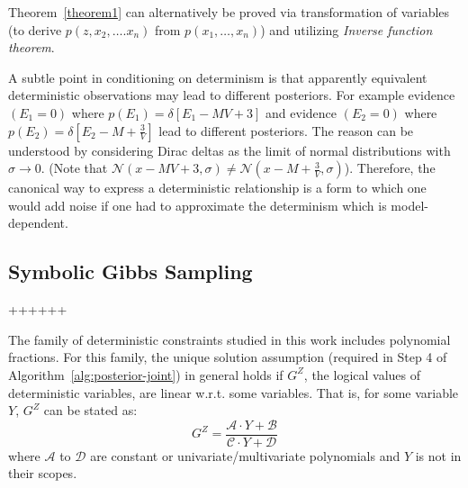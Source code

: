 \documentclass{article}
\newcommand{\pr}{p}
\begin{document}
Theorem~\ref{theorem1} can alternatively be proved via transformation of variables 
(to derive $\pr(z, x_2, \ldots. x_n)$ from $\pr(x_1, \ldots, x_n)$) and utilizing \emph{Inverse function theorem}.

A subtle point in conditioning on determinism is that apparently equivalent deterministic observations may lead to different posteriors. For example evidence $(E_1 = 0)$ where $\pr(E_1)= \delta[E_1 - M V + 3]$ and 
evidence $(E_2 = 0)$ where $\pr(E_2) = \delta[E_2 - M + \frac{3}{V}]$ lead to different posteriors. 
The reason can be understood by considering Dirac deltas as the limit of normal distributions with $\sigma \rightarrow 0$.
(Note that 
$\mathcal{N}(x - MV + 3, \sigma) \neq \mathcal{N}(x -M + \frac{3}{V}, \sigma)$).
Therefore, the canonical way to express a deterministic relationship is a form to which one would add noise if one had to approximate the determinism which is model-dependent. 
  



\subsection{Symbolic Gibbs Sampling}
++++++


The family of deterministic constraints studied in this work includes polynomial fractions.
For this family, 
the unique solution assumption (required in Step 4 of Algorithm~\ref{alg:posterior-joint})
in general holds if $G^Z$, the logical values of deterministic variables, are linear w.r.t. some variables.
That is, for some variable $Y$, $G^Z$ can be stated as: 
{\footnotesize
\begin{equation}
\label{eq:evidence-form}
G^Z = \frac{\mathcal{A} \cdot Y + \mathcal{B}}{\mathcal{C} \cdot Y + \mathcal{D}}
\end{equation}
}
where $\mathcal{A}$ to $\mathcal{D}$ are constant or univariate/multivariate polynomials and $Y$ is not in their scopes.
\end{document}
